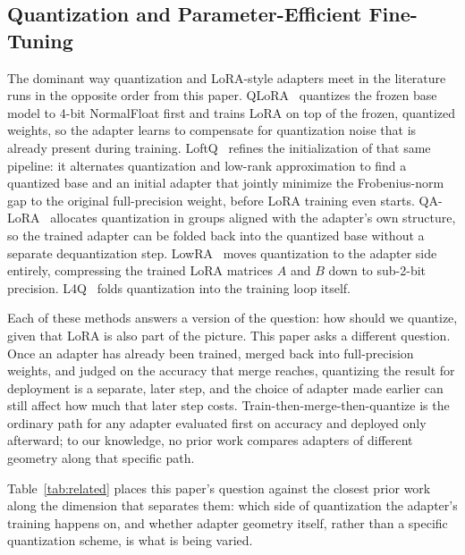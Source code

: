 \documentclass[conference]{IEEEtran}
\begin{document}
\subsection{Quantization and Parameter-Efficient Fine-Tuning}

The dominant way quantization and LoRA-style adapters meet in the literature runs in the opposite order from this paper. QLoRA~\cite{dettmers2023qlora} quantizes the frozen base model to 4-bit NormalFloat first and trains LoRA on top of the frozen, quantized weights, so the adapter learns to compensate for quantization noise that is already present during training. LoftQ~\cite{loftq} refines the initialization of that same pipeline: it alternates quantization and low-rank approximation to find a quantized base and an initial adapter that jointly minimize the Frobenius-norm gap to the original full-precision weight, before LoRA training even starts. QA-LoRA~\cite{qalora} allocates quantization in groups aligned with the adapter's own structure, so the trained adapter can be folded back into the quantized base without a separate dequantization step. LowRA~\cite{lowra} moves quantization to the adapter side entirely, compressing the trained LoRA matrices $A$ and $B$ down to sub-2-bit precision. L4Q~\cite{l4q} folds quantization into the training loop itself.

Each of these methods answers a version of the question: how should we quantize, given that LoRA is also part of the picture. This paper asks a different question. Once an adapter has already been trained, merged back into full-precision weights, and judged on the accuracy that merge reaches, quantizing the result for deployment is a separate, later step, and the choice of adapter made earlier can still affect how much that later step costs. Train-then-merge-then-quantize is the ordinary path for any adapter evaluated first on accuracy and deployed only afterward; to our knowledge, no prior work compares adapters of different geometry along that specific path.

Table~\ref{tab:related} places this paper's question against the closest prior work along the dimension that separates them: which side of quantization the adapter's training happens on, and whether adapter geometry itself, rather than a specific quantization scheme, is what is being varied.
\end{document}
